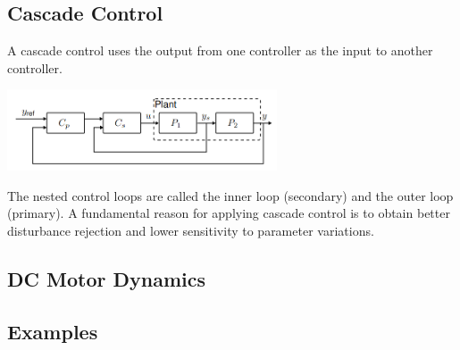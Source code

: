 \subsection{Cascade Control}
A cascade control uses the output from one controller as the input to another controller.


\begin{center}
	\includegraphics[width=0.6\textwidth]{Images/cascade.png}
\end{center}

The nested control loops are called the inner loop (secondary) and the outer loop (primary).
A fundamental reason for applying cascade control is to obtain better disturbance rejection
and lower sensitivity to parameter variations.


\subsection{DC Motor Dynamics}



\subsection{Examples}
